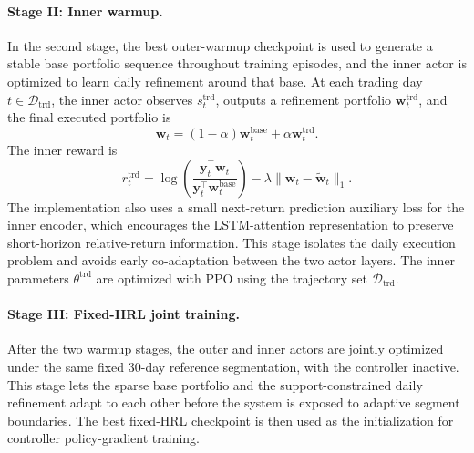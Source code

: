 \documentclass[letterpaper]{article} %
\begin{document}
\paragraph{Stage II: Inner warmup.}
In the second stage, the best outer-warmup checkpoint is used to generate a stable base portfolio sequence throughout training episodes, and the inner actor is optimized to learn daily refinement around that base. At each trading day \(t\in\mathcal{D}_{\mathrm{trd}}\), the inner actor observes \(s_t^{\mathrm{trd}}\), outputs a refinement portfolio \(\mathbf{w}_t^{\mathrm{trd}}\), and the final executed portfolio is
\[
\mathbf{w}_t
=
(1-\alpha)\mathbf{w}_t^{\mathrm{base}}
+
\alpha \mathbf{w}_t^{\mathrm{trd}}.
\]
The inner reward is
\[
r_t^{\mathrm{trd}}
=
\log\!\left(
\frac{\mathbf{y}_t^\top \mathbf{w}_t}
{\mathbf{y}_t^\top \mathbf{w}_t^{\mathrm{base}}}
\right)
-
\lambda \|\mathbf{w}_t-\tilde{\mathbf{w}}_t\|_1.
\]
The implementation also uses a small next-return prediction auxiliary loss for the inner encoder, which encourages the LSTM-attention representation to preserve short-horizon relative-return information. This stage isolates the daily execution problem and avoids early co-adaptation between the two actor layers. The inner parameters \(\theta^{\mathrm{trd}}\) are optimized with PPO using the trajectory set \(\mathcal{D}_{\mathrm{trd}}\).

\paragraph{Stage III: Fixed-HRL joint training.}
After the two warmup stages, the outer and inner actors are jointly optimized under the same fixed 30-day reference segmentation, with the controller inactive. This stage lets the sparse base portfolio and the support-constrained daily refinement adapt to each other before the system is exposed to adaptive segment boundaries. The best fixed-HRL checkpoint is then used as the initialization for controller policy-gradient training.
\end{document}
